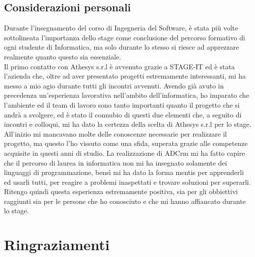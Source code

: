 \documentclass[12pt,a4paper,twoside,openany,english]{book}
\begin{document}
\section{Considerazioni personali}
Durante l'insegnamento del corso di Ingegneria del Software, è stata più volte sottolineata l'importanza dello stage come conclusione del percorso formativo di ogni studente di Informatica, ma solo durante lo stesso si riesce ad apprezzare realmente quanto questo sia essenziale.\\
Il primo contatto con Athesys s.r.l è avvenuto grazie a STAGE-IT ed è stata l'azienda che, oltre ad aver presentato progetti estremamente interessanti, mi ha messo a mio agio durante tutti gli incontri avvenuti. Avendo già avuto in precedenza un'esperienza lavorativa nell'ambito dell'informatica, ho imparato che l'ambiente ed il team di lavoro sono tanto importanti quanto il progetto che si andrà a svolgere, ed è stato il connubio di questi due elementi che, a seguito di incontri e colloqui, mi ha dato la certezza della scelta di Athesys s.r.l per lo stage.\\
All'inizio mi mancavano molte delle conoscenze necessarie per realizzare il progetto, ma questo l'ho vissuto come una sfida, superata grazie alle competenze acquisite in questi anni di studio. La realizzazione di ADCrm mi ha fatto capire che il percorso di laurea in informatica non mi ha insegnato solamente dei linguaggi di programmazione, bensì mi ha dato la forma mentis per apprenderli ed usarli tutti, per reagire a problemi inaspettati e trovare soluzioni per superarli.\\ 
Ritengo quindi questa esperienza estremamente positiva, sia per gli obbiettivi raggiunti sia per le persone che ho conosciuto e che mi hanno affiancato durante lo stage.


\chapter*{Ringraziamenti}
\end{document}
